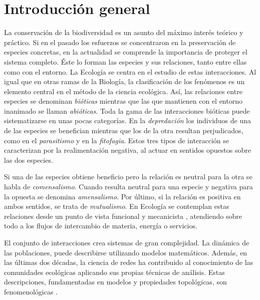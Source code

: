 
\chapter{Introducción general} %

\label{INTROGEN} %


La conservación de la biodiversidad es un asunto del máximo interés teórico y práctico. Si en el pasado los esfuerzos se concentraron en la preservación de especies concretas, en la actualidad se comprende la importancia de proteger el sistema completo. Éste lo forman las especies y sus relaciones, tanto entre ellas como con el entorno. La Ecología se centra en el estudio de estas interacciones. Al igual que en otras ramas de la Biología, la clasificación de los fenómenos es un elemento central en el método de la ciencia ecológica. Así, las relaciones entre especies se denominan \textit{bióticas} mientras que las que mantienen con el entorno inanimado se llaman \textit{abióticas}. Toda la gama de las interacciones bióticas puede sistematizarse en unas pocas categorías. En la \textit{depredación} los individuos de una de las especies se benefician mientras que los de la otra resultan perjudicados, como en el \textit{parasitismo} y en la \textit{fitofagia}. Estos tres tipos de interacción se caracterizan por la realimentación negativa, al actuar en sentidos opuestos sobre las dos especies. 

Si una de las especies obtiene beneficio pero la relación es neutral para la otra se habla de \textit{comensalismo}. Cuando resulta neutral para una especie y negativa para la opuesta se denomina \textit{amensalismo}. Por último, si la relación es positiva en ambos sentidos, se trata de \textit{mutualismo}. En Ecología se contemplan estas relaciones desde un punto de vista funcional y mecanicista \cite{rockwood2006introduction}, atendiendo sobre todo a los flujos de intercambio de materia, energía o servicios.

El conjunto de interacciones crea sistemas de gran complejidad. La dinámica de las poblaciones, puede describirse utilizando modelos matemáticos. Además, en las últimas dos décadas, la ciencia de redes ha contribuido al conocimiento de las comunidades ecológicas aplicando sus propias técnicas de análisis. Estas descripciones, fundamentadas en modelos y propiedades topológicas, son fenomenológicas \cite{van2010ethical}.

